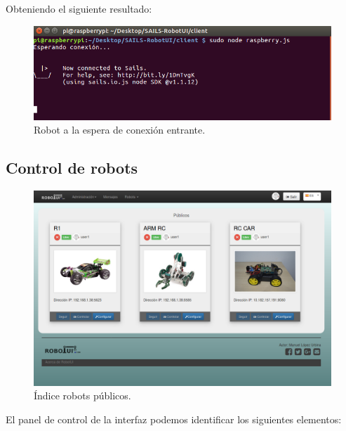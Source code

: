 Obteniendo el siguiente resultado:

\begin{figure}[H]
  \begin{center}
    \includegraphics[scale=.6]{imagenes/manual-usuario/espera-conexion.png}
  \end{center}
  \caption{ Robot a la espera de conexión entrante.}
  \label{website:pagina-principal}
\end{figure}

\subsection{ Control de robots }
\label{sec:control-robot}


\begin{figure}[H]
  \begin{center}
    \includegraphics[scale=.25]{imagenes/manual-usuario/robots-publicos.png}
  \end{center}
  \caption{ Índice robots públicos.}
  \label{website:pagina-principal}
\end{figure}

El panel de control de la interfaz podemos identificar los siguientes elementos:

